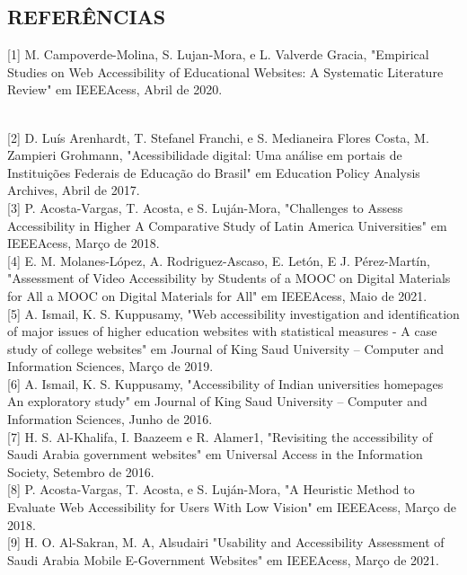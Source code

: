 \documentclass[a4paper]{article}
\begin{document}
\begin{titlepage}
\section*{REFERÊNCIAS}
\hspace{-0.05\textwidth}
\begin{minipage}{1\textwidth}
[1] M. Campoverde-Molina, S. Lujan-Mora, e L. Valverde Gracia, "Empirical Studies on Web Accessibility of Educational Websites: A Systematic Literature Review" em IEEEAcess, Abril de 2020.
\end{minipage}\\[0.5cm]
[2] D. Luís Arenhardt, T. Stefanel Franchi, e S. Medianeira Flores Costa, M. Zampieri Grohmann, "Acessibilidade digital: Uma análise em portais de Instituições Federais de Educação do Brasil" em Education Policy Analysis Archives, Abril de 2017.\\[0.5cm] [3] P. Acosta-Vargas, T. Acosta, e S. Luján-Mora, "Challenges to Assess Accessibility in Higher A Comparative Study of Latin America Universities" em IEEEAcess, Março de 2018.\\[0.5cm] [4] E. M. Molanes-López, A. Rodriguez-Ascaso, E. Letón, E J. Pérez-Martín, "Assessment of Video Accessibility by Students of a MOOC on Digital Materials for All a MOOC on Digital Materials for All" em IEEEAcess, Maio de 2021.\\[0.5cm] [5] A. Ismail, K. S. Kuppusamy, "Web accessibility investigation and identification of major issues of higher education websites with statistical measures - A case study of college websites" em Journal of King Saud University – Computer and Information Sciences, Março de 2019.\\[0.5cm] [6] A. Ismail, K. S. Kuppusamy, "Accessibility of Indian universities homepages An exploratory study" em Journal of King Saud University – Computer and Information Sciences, Junho de 2016.\\[0.5cm] [7] H. S. Al-Khalifa, I. Baazeem e R. Alamer1, "Revisiting the accessibility of Saudi Arabia government websites" em Universal Access in the Information Society, Setembro de 2016.\\[0.5cm] [8] P. Acosta-Vargas, T. Acosta, e S. Luján-Mora, "A Heuristic Method to Evaluate Web Accessibility for Users With Low Vision" em IEEEAcess, Março de 2018.\\[0.5cm] [9] H. O. Al-Sakran, M. A, Alsudairi "Usability and Accessibility Assessment of Saudi Arabia Mobile E-Government Websites" em IEEEAcess, Março de 2021.

\end{titlepage}
\end{document}
